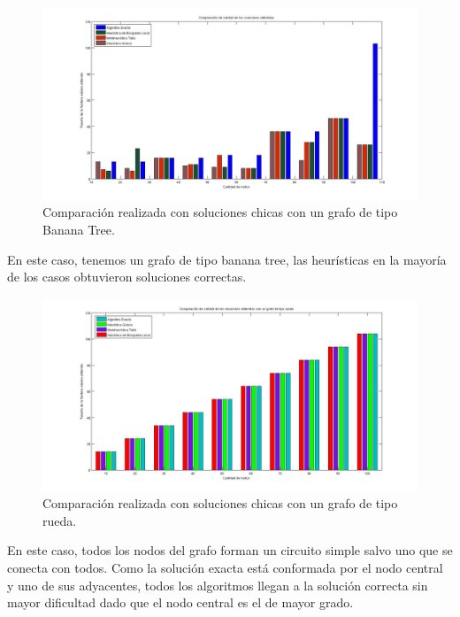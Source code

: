  \begin{figure}[H] %
\begin{center}
\includegraphics[width=500pt]{../imgs/calidadSolucionesChicas3.jpg}
\caption{Comparación realizada con soluciones chicas con un grafo de tipo Banana Tree.}
\end{center}
\end{figure}

En este caso, tenemos un grafo de tipo banana tree, las heurísticas en la mayoría de los casos obtuvieron soluciones correctas.

 \begin{figure}[H] %
\begin{center}
\includegraphics[width=500pt]{../imgs/calidadSolucionesChicas2.jpg}
\caption{Comparación realizada con soluciones chicas con un grafo de tipo rueda.}
\end{center}
\end{figure}

En este caso, todos los nodos del grafo forman un circuito simple salvo uno que se conecta con todos. Como la solución exacta está conformada por el nodo central y uno de sus adyacentes, todos los algoritmos llegan a la solución correcta sin mayor dificultad dado que el nodo central es el de mayor grado.


